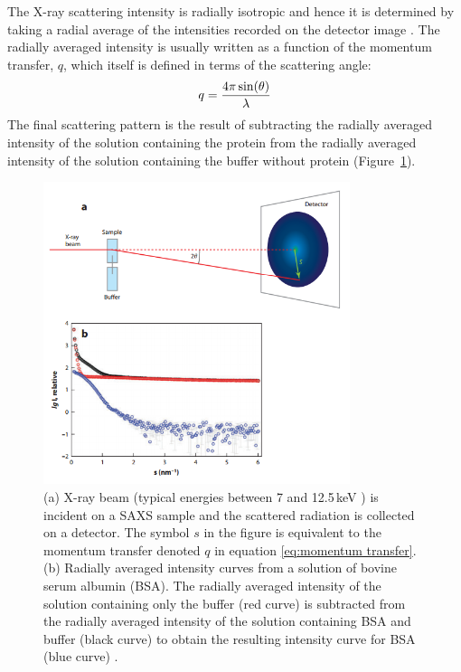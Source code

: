     The X-ray scattering intensity is radially isotropic and hence it is determined by taking a radial average of the intensities recorded on the detector image \cite{franke2015correlation}.
    The radially averaged intensity is usually written as a function of the momentum transfer, $q$, which itself is defined in terms of the scattering angle:
    \begin{equation}
        q = \frac{4 \pi \sin(\theta)}{\lambda}
        \label{eq:momentum transfer}
    \end{equation}
    The final scattering pattern is the result of subtracting the radially averaged intensity of the solution containing the protein from the radially averaged intensity of the solution containing the buffer without protein (Figure~\ref{fig:SAXS scattering curve}).
    \begin{figure}
        \centering
        \includegraphics[width=0.8\textwidth]{figures/introduction/SAXS_scattering.png}
        \caption[SAXS data collection schematic and resulting radially averaged intensity curve.]{(a) X-ray beam (typical energies between 7 and 12.5\,keV \cite{hopkins2016quantifying}) is incident on a SAXS sample and the scattered radiation is collected on a detector.
        The symbol $s$ in the figure is equivalent to the momentum transfer denoted $q$ in equation \ref{eq:momentum transfer}.
        (b) Radially averaged intensity curves from a solution of bovine serum albumin (BSA).
        The radially averaged intensity of the solution containing only the buffer (red curve) is subtracted from the radially averaged intensity of the solution containing BSA and buffer (black curve) to obtain the resulting intensity curve for BSA (blue curve) \cite{blanchet2013small}.}
        \label{fig:SAXS scattering curve}
    \end{figure}

